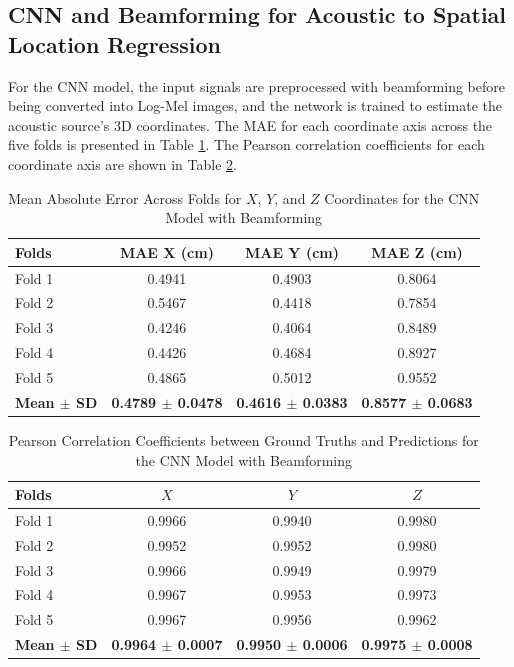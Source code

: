 \subsection{CNN and Beamforming for Acoustic to Spatial Location Regression}
\label{subsec:cnn_beamforming_regression}

For the CNN model, the input signals are preprocessed with beamforming before being converted into Log-Mel images, and the network is trained to estimate the acoustic source's 3D coordinates. The MAE for each coordinate axis across the five folds is presented in Table \ref{tab:BeamCNN_mae_xyz_folds}. The Pearson correlation coefficients for each coordinate axis are shown in Table \ref{tab:BeamCNN_pearson_corr_xyz}.


\begin{table}[htbp]
  \centering
  \caption{Mean Absolute Error Across Folds for $X$, $Y$, and $Z$ Coordinates for the CNN Model with Beamforming}
  \label{tab:BeamCNN_mae_xyz_folds}
  \vspace{0.25cm}
  \footnotesize
  \begin{tabular}{lccc}
    \toprule
    \textbf{Folds} & \textbf{MAE X (cm)} & \textbf{MAE Y (cm)} & \textbf{MAE Z (cm)}\\
    \midrule
    Fold 1 & 0.4941 & 0.4903 & 0.8064 \\
    Fold 2 & 0.5467 & 0.4418 & 0.7854 \\
    Fold 3 & 0.4246 & 0.4064 & 0.8489 \\
    Fold 4 & 0.4426 & 0.4684 & 0.8927 \\
    Fold 5 & 0.4865 & 0.5012 & 0.9552 \\
    \midrule
    \textbf{Mean $\pm$ SD} & \textbf{0.4789 $\pm$ 0.0478} & \textbf{0.4616 $\pm$ 0.0383} & \textbf{0.8577 $\pm$ 0.0683} \\
    \bottomrule
  \end{tabular}
\end{table}


\begin{table}[htbp]
  \centering
  \caption{Pearson Correlation Coefficients between Ground Truths and Predictions for the CNN Model with Beamforming}
  \label{tab:BeamCNN_pearson_corr_xyz}
  \vspace{0.25cm}
  \begin{tabular}{lccc}
    \toprule
    \textbf{Folds} & \textbf{$X$} & \textbf{$Y$} & \textbf{$Z$} \\
    \midrule
    Fold 1 & 0.9966 & 0.9940 & 0.9980 \\
    Fold 2 & 0.9952 & 0.9952 & 0.9980 \\
    Fold 3 & 0.9966 & 0.9949 & 0.9979 \\
    Fold 4 & 0.9967 & 0.9953 & 0.9973 \\
    Fold 5 & 0.9967 & 0.9956 & 0.9962 \\
    \midrule
    \textbf{Mean $\pm$ SD} & \textbf{0.9964 $\pm$ 0.0007} & \textbf{0.9950 $\pm$ 0.0006} & \textbf{0.9975 $\pm$ 0.0008} \\
    \bottomrule
  \end{tabular}
\end{table}




